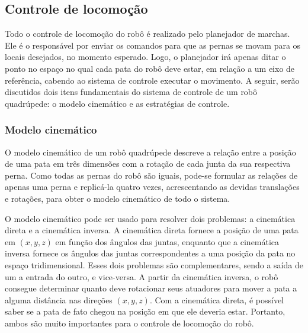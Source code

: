 \documentclass[conference]{IEEEtran}
\begin{document}
\subsection{Controle de locomoção}

Todo o controle de locomoção do robô é realizado pelo planejador de marchas. Ele é o responsável por enviar os comandos para que as pernas se movam para os locais desejados, no momento esperado. Logo, o planejador irá apenas ditar o ponto no espaço no qual cada pata do robô deve estar, em relação a um eixo de referência, cabendo ao sistema de controle executar o movimento. A seguir, serão discutidos dois itens fundamentais do sistema de controle de um robô quadrúpede: o modelo cinemático e as estratégias de controle.

\subsubsection{Modelo cinemático}
O modelo cinemático de um robô quadrúpede descreve a relação entre a posição de uma pata em três dimensões com a rotação de cada junta da sua respectiva perna. Como todas as pernas do robô são iguais, pode-se formular as relações de apenas uma perna e replicá-la quatro vezes, acrescentando as devidas translações e rotações, para obter o modelo cinemático de todo o sistema.

O modelo cinemático pode ser usado para resolver dois problemas: a cinemática direta e a cinemática inversa. A cinemática direta fornece a posição de uma pata em $(x, y, z)$ em função dos ângulos das juntas, enquanto que a cinemática inversa fornece os ângulos das juntas correspondentes a uma posição da pata no espaço tridimensional. Esses dois problemas são complementares, sendo a saída de um a entrada do outro, e vice-versa. A partir da cinemática inversa, o robô consegue determinar quanto deve rotacionar seus atuadores para mover a pata a alguma distância nas direções $(x, y, z)$. Com a cinemática direta, é possível saber se a pata de fato chegou na posição em que ele deveria estar. Portanto, ambos são muito importantes para o controle de locomoção do robô.
\end{document}
